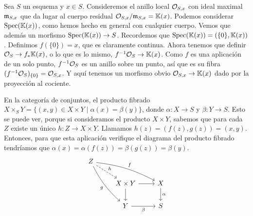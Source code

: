 \documentclass[GA.tex]{subfiles}
\begin{document}
Sea $S$ un esquema y $x\in S$. Consideremos el anillo local ${\mathcal O}_{S,x}$ con ideal maximal ${\mathfrak{m}}_{S,x}$ que da lugar al cuerpo residual ${\mathcal O}_{S,x}/{\mathfrak{m}}_{S,x}=\mathbb{K}(x)$. Podemos considerar $\operatorname{Spec}(\mathbb{K}(x))$, como hemos hecho en general con cualquier cuerpo. Vemos que además un morfismo $\operatorname{Spec}(\mathbb{K}(x))\to S$. Recordemos que $\operatorname{Spec}(\mathbb{K}(x))=(\{0\},\mathbb{K}(x))$. Definimos $f(\{0\})=x$, que es claramente continua. Ahora tenemos que definir ${\mathcal O}_S\to f_*\mathbb{K}(x)$, o lo que es lo mismo, $f^{-1}{\mathcal O}_S\to \mathbb{K}(x)$. Como $f$ es una aplicación de un solo punto, $f^{-1}{\mathcal O}_S$ es un anillo sobre un punto, así que es su fibra $(f^{-1}{\mathcal O}_S)_{\{0\}}={\mathcal O}_{S,x}$. Y aquí tenemos un morfismo obvio ${\mathcal O}_{S,x}\to \mathbb{K}(x)$ dado por la proyección al cociente. 

\begin{ej}
En la categoría de conjuntos, el producto fibrado $X\times_{S} Y=\{(x,y)\in X\times Y\mid \alpha(x)=\beta(y)\}$, donde $\alpha:X\to S$ y $\beta:Y\to S$. Esto se puede ver, porque si consideramos el producto $X\times Y$, sabemos que para cada $Z$ existe un único $h:Z\to X\times Y$. Llamamos $h(z)=(f(z),g(z))=(x,y)$. Entonces, para que esta aplicación verifique el diagrama del producto fibrado tendríamos que $\alpha(x)=\alpha(f(z))=\beta(g(z))=\beta(y)$. 
\[
\begin{tikzcd}
Z\arrow[dr, dashed, "h"]\arrow[drr, bend left=10, "f"]\arrow[ddr, bend right=10, "g"'] & &\\ 
& X\times Y\arrow[r]\arrow[d] & X\arrow[d, "\alpha"]\\
& Y\arrow[r, "\beta"'] & S
\end{tikzcd}
\]
\end{ej}
\end{document}
